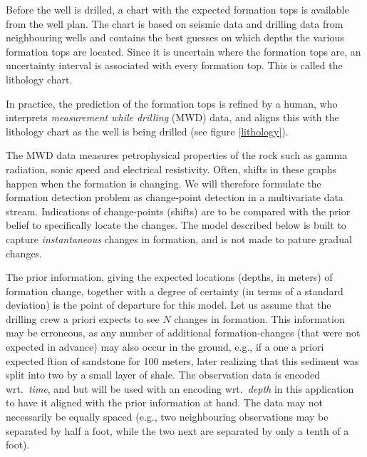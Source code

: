 Before the well is drilled, a chart with the expected formation tops is available from the well plan. The chart is based on seismic data and drilling data from neighbouring wells and contains the best guesses on which depths the various formation tops are located. Since it is uncertain where the formation tops are, an uncertainty interval is associated with every formation top. This is called the lithology chart. 

In practice, the prediction of the formation tops is refined by a human, who interprets  {\em measurement while drilling} (MWD) data, and aligns this with the lithology chart as the well is being drilled (see figure \ref{lithology}).

The MWD data measures petrophysical properties of the rock such as gamma radiation, sonic speed and electrical resistivity. 
Often, shifts in these graphs happen when the formation is changing. We will therefore formulate the formation detection problem as change-point detection in a multivariate data stream. 
Indications of change-points (shifts) are to be compared with the prior belief to specifically locate the changes. The model described below is built to capture \textit{instantaneous} changes in formation, and is not made to pature gradual changes. 

The prior information, giving the expected locations (depths, in meters) of formation change, together with a degree of certainty (in terms of a standard deviation) is the point of departure for this model. Let us assume that the drilling crew a priori expects  to see $N$ changes in formation. 
This information may be erroneous, as any number of additional formation-changes (that were not expected in advance) may also occur in the ground, e.g., if a one a priori expected ftion of sandstone for 100 meters, later realizing that this sediment was split into two by a small layer of shale.
The observation data is encoded wrt.\ \textit{time}, and but will be used with an encoding wrt.\ \textit{depth} in this application to have it aligned with the prior information at hand. The data may not necessarily be equally spaced (e.g., two neighbouring observations may be separated by half a foot, while the two next are separated by only a tenth of a foot). 
 
